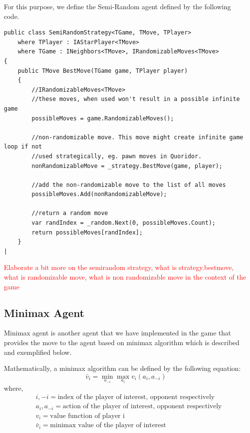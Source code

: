 For this purpose, we define the Semi-Random agent defined by the following code. 

\begin{lstlisting}
public class SemiRandomStrategy<TGame, TMove, TPlayer>
    where TPlayer : IAStarPlayer<TMove>
    where TGame : INeighbors<TMove>, IRandomizableMoves<TMove>
{
    public TMove BestMove(TGame game, TPlayer player)
    {
        //IRandomizableMoves<TMove>
        //these moves, when used won't result in a possible infinite game
        possibleMoves = game.RandomizableMoves();

        //non-randomizable move. This move might create infinite game loop if not 
        //used strategically, eg. pawn moves in Quoridor.
        nonRandomizableMove = _strategy.BestMove(game, player);

        //add the non-randomizable move to the list of all moves
        possibleMoves.Add(nonRandomizableMove);

        //return a random move
        var randIndex = _random.Next(0, possibleMoves.Count);
        return possibleMoves[randIndex];
    }
|
\end{lstlisting}

\textcolor{red}{Elaborate a bit more on the semirandom strategy, what is strategy.bestmove, what is randomizable move, what is non randomizable move in the context of the game}


\subsection{Minimax Agent}

Minimax agent is another agent that we have implemented in the game that provides the move to the agent based on minimax algorithm which is described and exemplified below.

Mathematically, a minimax algorithm can be defined by the following equation:
\begin{equation}\label{eq:mmax}
    \bar{v}_i = \min_{a_{-i}} \max_{a_{i}} v_i (a_i, a_{-i})
\end{equation}
where,
\begin{subequations}
\begin{align}
    &i, -i = \text{index of the player of interest, opponent respectively} \\
    &a_i, a_{-i}= \text{action of the player of interest, opponent respectively} \\
    &v_i = \text{value function of player i} \\
    &\bar{v}_i = \text{minimax value of the player of interest}
\end{align}
\end{subequations}

